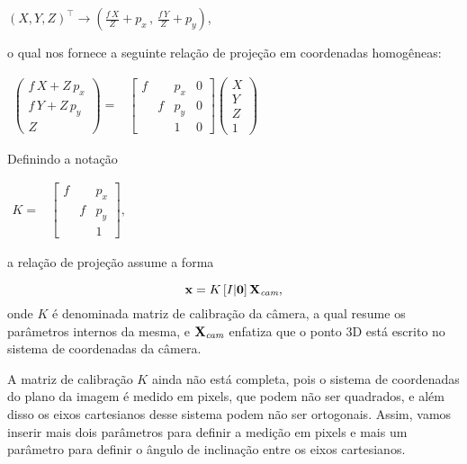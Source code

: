 \begin{center}
$(X,Y,Z)^\top \rightarrow (\frac{f\,X}{Z}+p_x\,,\,\frac{f\,Y}{Z}+p_y)$,
\end{center}
o qual nos fornece a seguinte relação de projeção em coordenadas homogêneas:

\begin{center}
$
\begin{array}{ccc}
\begin{pmatrix}
f\,X + Z\,p_x\\
f\,Y + Z\,p_y\\
Z
\end{pmatrix}=
&
\begin{bmatrix}
f& &p_x&0\\
 &f&p_y&0\\
 & &1&0
\end{bmatrix}
\begin{pmatrix}
X\\
Y\\
Z\\
1
\end{pmatrix}
\end{array}
$
\end{center}

Definindo a notação

\begin{center}
$
\begin{array}{cc}
K = & \begin{bmatrix}
      f& &p_x\\
       &f&p_y\\
       & &1
      \end{bmatrix}, 
\end{array}
$
\end{center}
a relação de projeção assume a forma


\begin{equation}
\mathbf{x}=K\,[I|{\bf 0}]\,\mathbf{X}_{\textit{cam}},
\end{equation}
onde $K$ é denominada matriz de calibração da câmera, a qual resume os parâmetros internos da mesma, e $\mathbf{X}_{\textit{cam}}$ enfatiza que o ponto 3D está escrito no sistema de coordenadas da câmera.

A matriz de calibração $K$ ainda não está completa, pois o sistema de coordenadas do plano da imagem é medido em pixels, que podem não ser quadrados, e além disso os eixos cartesianos desse sistema podem não ser ortogonais. Assim, vamos inserir mais dois parâmetros para definir a medição em pixels e mais um parâmetro para definir o ângulo de inclinação entre os eixos cartesianos.

